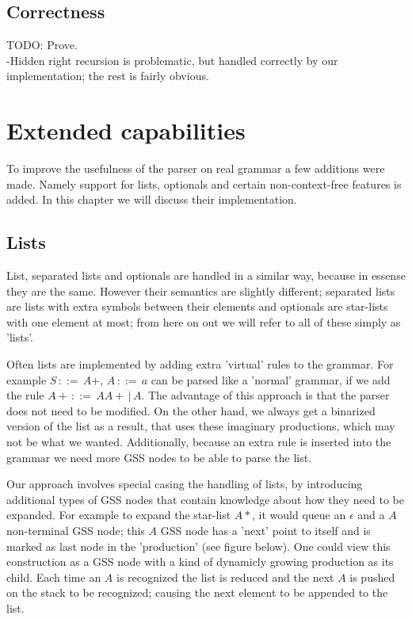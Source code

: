 \documentclass[a4paper,10pt]{article}
\begin{document}
\subsection{Correctness}

TODO: Prove.\\
-Hidden right recursion is problematic, but handled correctly by our implementation; the rest is fairly obvious.

\section{Extended capabilities}

To improve the usefulness of the parser on real grammar a few additions were made. Namely support for lists, optionals and certain non-context-free features is added. In this chapter we will discuss their implementation.

\subsection{Lists}

List, separated lists and optionals are handled in a similar way, because in essense they are the same. However their semantics are slightly different; separated lists are lists with extra symbols between their elements and optionals are star-lists with one element at most; from here on out we will refer to all of these simply as 'lists'.

Often lists are implemented by adding extra 'virtual' rules to the grammar. For example $S\,::=\,A+,\,A\,::=\,a$ can be parsed like a 'normal' grammar, if we add the rule $A+\,::=\,AA+\,|\,A$. The advantage of this approach is that the parser does not need to be modified. On the other hand, we always get a binarized version of the list as a result, that uses these imaginary productions, which may not be what we wanted. Additionally, because an extra rule is inserted into the grammar we need more GSS nodes to be able to parse the list.

Our approach involves special casing the handling of lists, by introducing additional types of GSS nodes that contain knowledge about how they need to be expanded. For example to expand the star-list $A*$, it would queue an $\epsilon$ and a $A$ non-terminal GSS node; this $A$ GSS node has a 'next' point to itself and is marked as last node in the 'production' (see figure below). One could view this construction as a GSS node with a kind of dynamicly growing production as its child. Each time an $A$ is recognized the list is reduced and the next $A$ is pushed on the stack to be recognized; causing the next element to be appended to the list.
\end{document}
